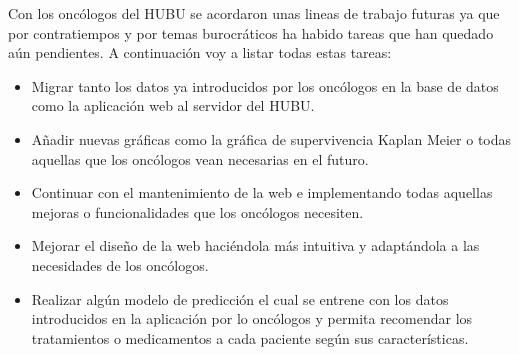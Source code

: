 Con los oncólogos del HUBU se acordaron unas lineas de trabajo futuras ya que por contratiempos y por temas burocráticos ha habido tareas que han quedado aún pendientes. A continuación voy a listar todas estas tareas:

\begin{itemize}
    \item Migrar tanto los datos ya introducidos por los oncólogos en la base de datos como la aplicación web al servidor del HUBU. 
    \item Añadir nuevas gráficas como la gráfica de supervivencia Kaplan Meier \cite{kaplan} o todas aquellas que los oncólogos vean necesarias en el futuro.
    \item Continuar con el mantenimiento de la web e implementando todas aquellas mejoras o funcionalidades que los oncólogos necesiten.
    \item Mejorar el diseño de la web haciéndola más intuitiva y adaptándola a las necesidades de los oncólogos.
    \item Realizar algún modelo de predicción el cual se entrene con los datos introducidos en la aplicación por lo oncólogos y permita recomendar los tratamientos o medicamentos a cada paciente según sus características.
\end{itemize}
